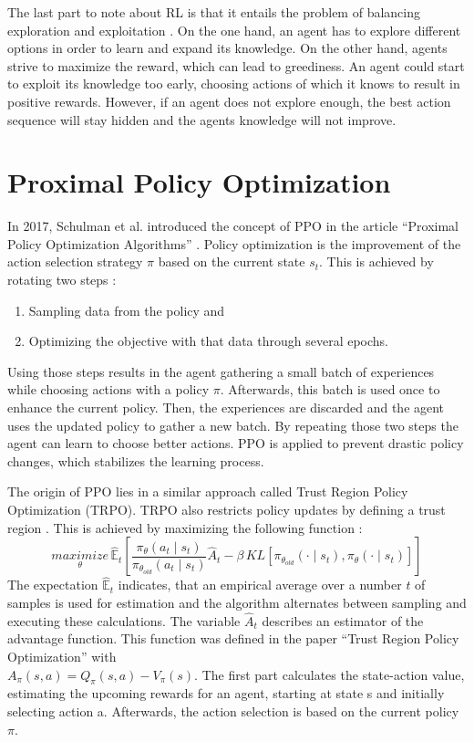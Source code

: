 The last part to note about RL is that it entails the problem of balancing exploration and exploitation \cite{suba18}. On the one hand, an agent has to explore different options in order to learn and expand its knowledge. On the other hand, agents strive to maximize the reward, which can lead to greediness. An agent could start to exploit its knowledge too early, choosing actions of which it knows to result in positive rewards. However, if an agent does not explore enough, the best action sequence will stay hidden and the agents knowledge will not improve.

\section{Proximal Policy Optimization}
In 2017, Schulman et al. introduced the concept of PPO in the article ``Proximal Policy Optimization Algorithms'' \cite{scwo17}. Policy optimization is the improvement of the action selection strategy $\pi$ based on the current state $s_{t}$. This is achieved by rotating two steps \cite{scwo17}: \\
\begin{enumerate}
  \item Sampling data from the policy and
  \item Optimizing the objective with that data through several epochs.
\end{enumerate}

Using those steps results in the agent gathering a small batch of experiences while choosing actions with a policy $\pi$. Afterwards, this batch is used once to enhance the current policy. Then, the experiences are discarded and the agent uses the updated policy to gather a new batch. By repeating those two steps the agent can learn to choose better actions. PPO is applied to prevent drastic policy changes, which stabilizes the learning process.

The origin of PPO lies in a similar approach called Trust Region Policy Optimization (TRPO). TRPO also restricts policy updates by defining a trust region \cite{scle15}. This is achieved by maximizing the following function \cite{scwo17}:
\begin{equation}\label{eq:TRPO}
    \underset{\theta}{maximize}\,\hat{\mathbb{E}}_{t} \left[ \frac{\pi_{\theta}(a_{t} \mid s_{t})}{\pi_{\theta_{old}}(a_{t} \mid s_{t})}
        \hat{A}_{t}-\beta \, KL[\pi_{\theta_{old}}(\cdot \mid s_{t}),\pi_{\theta}(\cdot \mid s_{t})] \right]
\end{equation}
The expectation $\hat{\mathbb{E}}_{t}$ indicates, that an empirical average over a number $t$ of samples is used for estimation and the algorithm alternates between sampling and executing these calculations. The variable $\hat{A}_{t}$ describes an estimator of the advantage function. This function was defined in the paper ``Trust Region Policy Optimization'' \cite{scle15} with \\ $A_\pi(s,a) = Q_\pi(s,a)-V_\pi(s)$. The first part calculates the state-action value, estimating the upcoming rewards for an agent, starting at state s and initially selecting action a. Afterwards, the action selection is based on the current policy $\pi$. 

